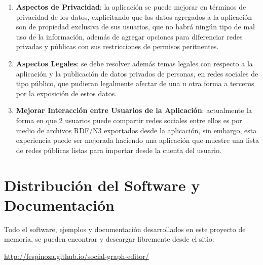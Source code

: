 \begin{enumerate}
    \item \textbf{Aspectos de Privacidad}: la aplicación se puede mejorar en términos de privacidad de los datos, explicitando que los datos agregados a la aplicación son de propiedad exclusiva de sus usuarios, que no habrá ningún tipo de mal uso de la información, además de agregar opciones para diferenciar redes privadas y públicas con sus restricciones de permisos peritnentes.
    
    \item \textbf{Aspectos Legales}: se debe resolver además temas legales con respecto a la aplicación y la publicación de datos privados de personas, en redes sociales de tipo público, que pudieran legalmente afectar de una u otra forma a terceros por la exposición de estos datos.
    
    \item \textbf{Mejorar Interacción entre Usuarios de la Aplicación}: actualmente la forma en que 2 usuarios puede compartir redes sociales entre ellos es por medio de archivos RDF/N3 exportados desde la aplicación, sin embargo, esta experiencia puede ser mejorada haciendo una aplicación que muestre una lista de redes públicas listas para importar desde la cuenta del usuario.
    
  \end{enumerate}


\section{Distribución del Software y Documentación} %
\label{sec:distribucion_del_software_y_documentacion}

Todo el software, ejemplos y documentación desarrollados en este proyecto de memoria, se pueden encontrar y descargar libremente desde el sitio:\\

\begin{center}
  \url{http://fespinoza.github.io/social-graph-editor/}
\end{center}

